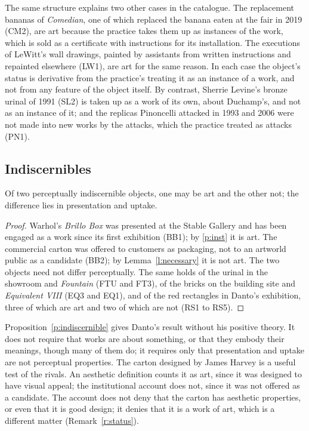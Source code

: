 \documentclass{situationist-preprint}
\begin{document}
The same structure explains two other cases in the catalogue. The replacement bananas of \emph{Comedian}, one of which replaced the banana eaten at the fair in 2019 (CM2), are art because the practice takes them up as instances of the work, which is sold as a certificate with instructions for its installation. The executions of LeWitt's wall drawings, painted by assistants from written instructions and repainted elsewhere (LW1), are art for the same reason. In each case the object's status is derivative from the practice's treating it as an instance of a work, and not from any feature of the object itself. By contrast, Sherrie Levine's bronze urinal of 1991 (SL2) is taken up as a work of its own, about Duchamp's, and not as an instance of it; and the replicas Pinoncelli attacked in 1993 and 2006 were not made into new works by the attacks, which the practice treated as attacks (PN1).

\subsection{Indiscernibles}

\begin{proposition}\label{p:indiscernible}
Of two perceptually indiscernible objects, one may be art and the other not; the difference lies in presentation and uptake.
\end{proposition}

\begin{proof}
Warhol's \emph{Brillo Box} was presented at the Stable Gallery and has been engaged as a work since its first exhibition (BB1); by \ref{p:inst} it is art. The commercial carton was offered to customers as packaging, not to an artworld public as a candidate (BB2); by Lemma~\ref{l:necessary} it is not art. The two objects need not differ perceptually. The same holds of the urinal in the showroom and \emph{Fountain} (FTU and FT3), of the bricks on the building site and \emph{Equivalent VIII} (EQ3 and EQ1), and of the red rectangles in Danto's exhibition, three of which are art and two of which are not (RS1 to RS5).
\end{proof}

Proposition~\ref{p:indiscernible} gives Danto's result without his positive theory. It does not require that works are about something, or that they embody their meanings, though many of them do; it requires only that presentation and uptake are not perceptual properties. The carton designed by James Harvey is a useful test of the rivals. An aesthetic definition counts it as art, since it was designed to have visual appeal; the institutional account does not, since it was not offered as a candidate. The account does not deny that the carton has aesthetic properties, or even that it is good design; it denies that it is a work of art, which is a different matter (Remark~\ref{r:status}).
\end{document}

